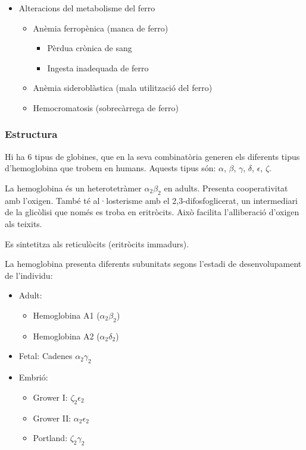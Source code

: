 \begin{itemize}
\begin{itemize}
\item Alteracions del metabolisme del ferro
  \begin{itemize}
  \item Anèmia ferropènica (manca de ferro)
    \begin{itemize}
    \item Pèrdua crònica de sang
    \item Ingesta inadequada de ferro
    \end{itemize}
  \item Anèmia sideroblàstica (mala utilització del ferro)
  \item Hemocromatosis (sobrecàrrega de ferro)
  \end{itemize}
\end{itemize}

\subsubsection{Estructura}
Hi ha 6 tipus de globines, que en la seva combinatòria generen els
diferents tipus d'hemoglobina que trobem en humans. Aquests tipus són:
$\alpha$, $\beta$, $\gamma$, $\delta$, $\epsilon$, $\zeta$.

La hemoglobina és un heterotetràmer $\alpha_2\beta_2$ en adults. Presenta
cooperativitat amb l'oxigen. També té al·losterisme amb el
2,3-difosfoglicerat, un intermediari de la glicòlisi que només es
troba en eritròcits. Això facilita l'alliberació d'oxigen als
teixits.

Es sintetitza als reticulòcits (eritròcits immadurs).

La hemoglobina presenta diferents subunitats segons l'estadi de
desenvolupament de l'individu:
\begin{itemize}
\item Adult:
  \begin{itemize}
  \item Hemoglobina A1 ($\alpha_2\beta_2$)
  \item Hemoglobina A2 ($\alpha_2\delta_2$)
  \end{itemize}

\item Fetal: Cadenes $\alpha_2\gamma_2$

\item Embrió:
  \begin{itemize}
  \item Grower I: $\zeta_2\epsilon_2$
  \item Grower II: $\alpha_2\epsilon_2$
  \item Portland: $\zeta_2\gamma_2$
  \end{itemize}
\end{itemize}


\end{itemize}
